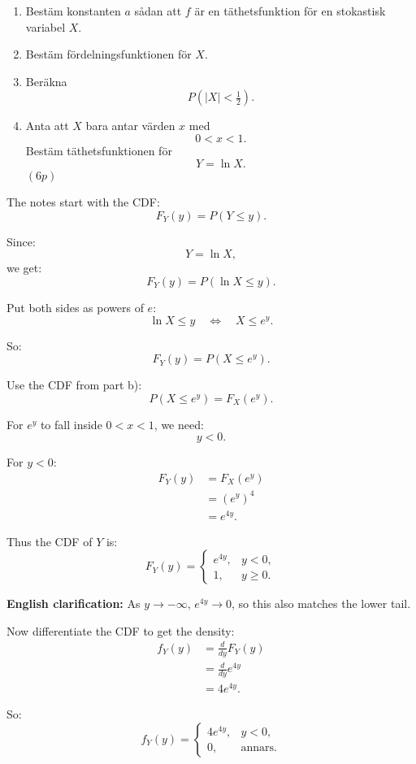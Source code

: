 \documentclass[10pt]{article}
\begin{document}
\begin{enumerate}[label=\alph*)]
\item Bestäm konstanten \(a\) sådan att \(f\) är en
täthetsfunktion för en stokastisk variabel \(X\).

\item Bestäm fördelningsfunktionen för \(X\).

\item Beräkna
\[
P(|X|<\tfrac12).
\]

\item Anta att \(X\) bara antar värden \(x\) med
\[
0<x<1.
\]
Bestäm täthetsfunktionen för
\[
Y=\ln X.
\]
\((6p)\)
\end{enumerate}

The notes start with the CDF:
\[
F_Y(y)=P(Y\le y).
\]

Since:
\[
Y=\ln X,
\]
we get:
\[
F_Y(y)=P(\ln X\le y).
\]

Put both sides as powers of \(e\):
\[
\ln X\le y
\quad \Longleftrightarrow \quad
X\le e^y.
\]

So:
\[
F_Y(y)=P(X\le e^y).
\]

Use the CDF from part b):
\[
P(X\le e^y)=F_X(e^y).
\]

For \(e^y\) to fall inside \(0<x<1\), we need:
\[
y<0.
\]

For \(y<0\):
\begin{align*}
F_Y(y)
&=
F_X(e^y)
\\[2mm]
&=
(e^y)^4
\\[2mm]
&=
e^{4y}.
\end{align*}

Thus the CDF of \(Y\) is:
\[
F_Y(y)=
\begin{cases}
e^{4y},
& y<0,\\
1,
& y\ge 0.
\end{cases}
\]

\textbf{English clarification:}
As \(y\to -\infty\), \(e^{4y}\to 0\), so this also
matches the lower tail.

Now differentiate the CDF to get the density:
\begin{align*}
f_Y(y)
&=
\frac{d}{dy}F_Y(y)
\\[2mm]
&=
\frac{d}{dy}e^{4y}
\\[2mm]
&=
4e^{4y}.
\end{align*}

So:
\[
f_Y(y)=
\begin{cases}
4e^{4y},
& y<0,\\
0,
& \text{annars}.
\end{cases}
\]
\end{document}
